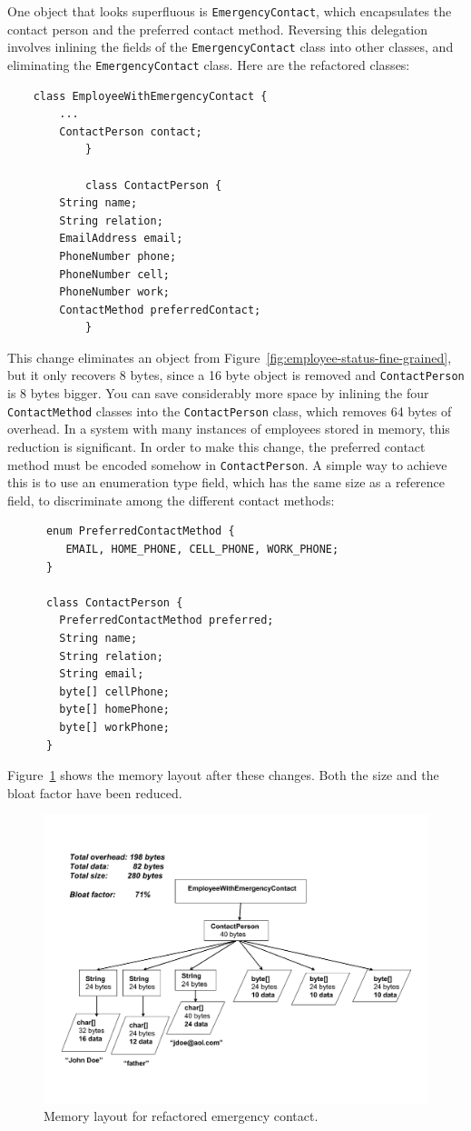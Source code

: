 One object that looks superfluous is \texttt{EmergencyContact}, which encapsulates the contact person and the preferred contact method.  
Reversing this delegation involves inlining the fields of the \texttt{EmergencyContact} class into other classes, and eliminating the \texttt{EmergencyContact} class. Here are the refactored classes:
\ttfamily
\begin{verbatim}
	class EmployeeWithEmergencyContact {
        ...
        ContactPerson contact;
			}
			
			class ContactPerson {
        String name;
        String relation;
        EmailAddress email;
        PhoneNumber phone;
        PhoneNumber cell;
        PhoneNumber work;
        ContactMethod preferredContact;
			}
\end{verbatim}
\normalfont
This change eliminates an object from Figure~\ref{fig:employee-status-fine-grained}, but it only recovers 8 bytes, since a 16 byte object is removed and \texttt{ContactPerson} is 8 bytes bigger. You can save considerably more space by inlining the four \texttt{ContactMethod} classes into the \texttt{ContactPerson} class, which removes 64 bytes of overhead. In a system with many instances of employees stored in memory, this reduction is significant. In order to make this change, the preferred contact method must be encoded somehow in \texttt{ContactPerson}.  A simple way to achieve this is to use an enumeration type field, which has the same size as a reference field, to discriminate among the different contact methods:
\ttfamily
\begin{verbatim} 
      enum PreferredContactMethod {
         EMAIL, HOME_PHONE, CELL_PHONE, WORK_PHONE;
      }
      
      class ContactPerson {
        PreferredContactMethod preferred;
        String name;
        String relation;
        String email;
        byte[] cellPhone;
        byte[] homePhone;
        byte[] workPhone;
      }		
\end{verbatim}
\normalfont
Figure~\ref{fig:refactored-fine-grain} shows the memory layout after these changes. Both the size and the bloat factor have been reduced.
 \begin{figure}
  \centering
 \includegraphics[width=.70\textwidth]{Figures/chapter4/refactored-fine-grain.pdf}
  \caption{Memory layout for refactored emergency contact.}
  \label{fig:refactored-fine-grain}
\end{figure}

